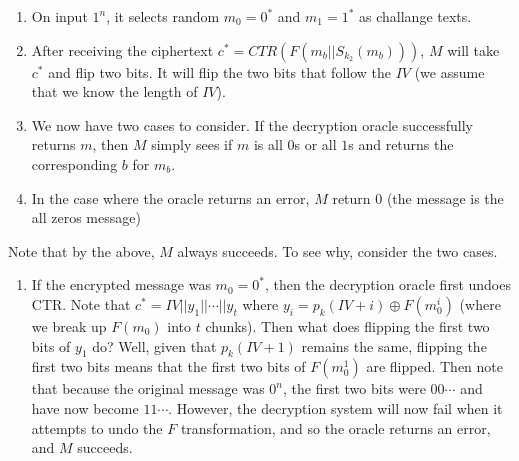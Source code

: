 \documentclass{article}
\begin{document}
\begin{enumerate}[,start=2]
\begin{enumerate}[,label=\alph*.]
\begin{mdbmarginx}{1ex}{0pt}{1ex}{0pt}
\begin{enumerate}[noitemsep,topsep=\mdcompacttopsep]%

\item{}On input $1^n$, it selects random $m_0 = 0^*$ and $m_1 = 1^*$ as challange texts.%

\item{}After receiving the ciphertext $c^* = CTR(F(m_b || S_{k_2}(m_b)))$, $M$ will take $c^*$ and 
flip two bits. It will flip the two bits that follow the $IV$ (we assume that we know the length
of $IV$).%

\item{}We now have two cases to consider. If the decryption oracle successfully returns $m$, then
$M$ simply sees if $m$ is all $0$s or all $1$s and returns the corresponding $b$ for $m_b$.%

\item{}In the case where the oracle returns an error, $M$ return $0$ (the message is the all zeros
message)%
\end{enumerate}%

\noindent{}Note that by the above, $M$ always succeeds. To see why, consider the two cases.%

\begin{enumerate}[noitemsep,topsep=\mdcompacttopsep]%

\item{}If the encrypted 
message was $m_0 = 0^*$, then the decryption oracle first undoes CTR. Note that $c^* = IV || y_1 || \cdots || y_t$
where $y_i = p_k(IV + i) \oplus F(m^i_0)$ (where we break up $F(m_0)$ into $t$ chunks). Then
what does flipping the first two bits of $y_1$ do? Well, given that $p_k(IV + 1)$ remains the
same, flipping the first two bits means that the first two bits of $F(m^1_0)$ are flipped. Then
note that because the original message was $0^n$, the first two bits were $00\cdots$ and have now become
$11\cdots$. However, the decryption system will now fail when it attempts to undo the $F$ transformation,
and so the oracle returns an error, and $M$ succeeds.%


\end{enumerate}
\end{mdbmarginx}
\end{enumerate}
\end{enumerate}
\end{document}
